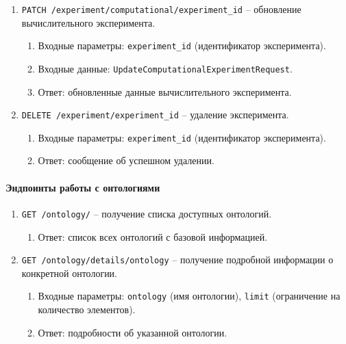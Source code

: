 \begin{enumerate}
    \item \texttt{PATCH /experiment/computational/{experiment\_id}} -- обновление вычислительного эксперимента.
    \begin{enumerate}[label=\arabic{enumi}.\arabic*.]
        \item Входные параметры: \texttt{experiment\_id} (идентификатор эксперимента).
        \item Входные данные: \texttt{UpdateComputationalExperimentRequest}.
        \item Ответ: обновленные данные вычислительного эксперимента.
    \end{enumerate}

    \item \texttt{DELETE /experiment/{experiment\_id}} -- удаление эксперимента.
    \begin{enumerate}[label=\arabic{enumi}.\arabic*.]
        \item Входные параметры: \texttt{experiment\_id} (идентификатор эксперимента).
        \item Ответ: сообщение об успешном удалении.
    \end{enumerate}
\end{enumerate}

\paragraph{Эндпоинты работы с онтологиями}

\begin{enumerate}
    \item \texttt{GET /ontology/} -- получение списка доступных онтологий.
    \begin{enumerate}[label=\arabic{enumi}.\arabic*.]
        \item Ответ: список всех онтологий с базовой информацией.
    \end{enumerate}

    \item \texttt{GET /ontology/details/{ontology}} -- получение подробной информации о конкретной онтологии.
    \begin{enumerate}[label=\arabic{enumi}.\arabic*.]
        \item Входные параметры: \texttt{ontology} (имя онтологии), \texttt{limit} (ограничение на количество элементов).
        \item Ответ: подробности об указанной онтологии.
    \end{enumerate}
\end{enumerate}

